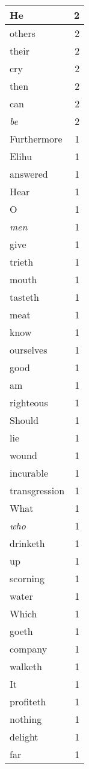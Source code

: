\begin{center}
\begin{longtable}{l|r}
He & 2 \\ \hline
others & 2 \\ \hline
their & 2 \\ \hline
cry & 2 \\ \hline
then & 2 \\ \hline
can & 2 \\ \hline
\emph{be} & 2 \\ \hline
Furthermore & 1 \\ \hline
Elihu & 1 \\ \hline
answered & 1 \\ \hline
Hear & 1 \\ \hline
O & 1 \\ \hline
\emph{men} & 1 \\ \hline
give & 1 \\ \hline
trieth & 1 \\ \hline
mouth & 1 \\ \hline
tasteth & 1 \\ \hline
meat & 1 \\ \hline
know & 1 \\ \hline
ourselves & 1 \\ \hline
good & 1 \\ \hline
am & 1 \\ \hline
righteous & 1 \\ \hline
Should & 1 \\ \hline
lie & 1 \\ \hline
wound & 1 \\ \hline
incurable & 1 \\ \hline
transgression & 1 \\ \hline
What & 1 \\ \hline
\emph{who} & 1 \\ \hline
drinketh & 1 \\ \hline
up & 1 \\ \hline
scorning & 1 \\ \hline
water & 1 \\ \hline
Which & 1 \\ \hline
goeth & 1 \\ \hline
company & 1 \\ \hline
walketh & 1 \\ \hline
It & 1 \\ \hline
profiteth & 1 \\ \hline
nothing & 1 \\ \hline
delight & 1 \\ \hline
far & 1 \\ \hline

\end{longtable}
\end{center}
